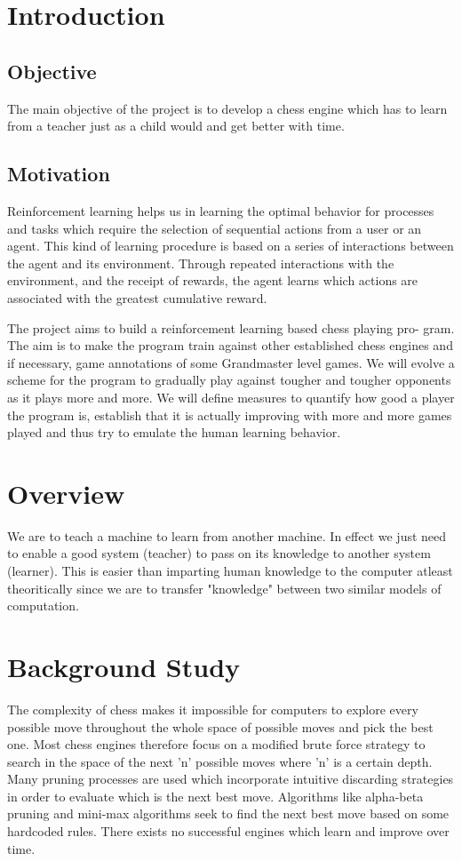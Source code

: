 \documentclass[a4paper,12pt,latin modern roman]{article}
\begin{document}
\section{Introduction}
\subsection*{Objective}
The main objective of the project is to develop a chess engine which has to learn from a teacher just as a child would and get better with time.
\subsection*{Motivation}
Reinforcement learning helps us in learning the optimal behavior for processes and tasks which require the selection of sequential actions from a user or an agent. This kind of learning procedure is based on a series of interactions between the agent and its environment. Through repeated interactions with the environment, and the receipt of rewards, the agent learns which actions are associated with the greatest cumulative reward.

The project aims to build a reinforcement learning based chess playing pro-
gram. The aim is to make the program train against other established chess
engines and if necessary, game annotations of some Grandmaster level games. We will
evolve a scheme for the program to gradually play against tougher and
tougher opponents as it plays more and more.
We will define measures to quantify how good a player the program is,
establish that it is actually improving with more and more games played and thus try to emulate the human learning behavior.

\section{Overview}
We are to teach a machine to learn from another machine. In effect we just need to enable a good system (teacher) to pass on its knowledge to another system (learner). This is easier than imparting human knowledge to the computer atleast theoritically since we are to transfer "knowledge" between two similar models of computation.  

\section{Background Study}
The complexity of chess makes it impossible for computers to explore every possible move throughout the whole space of possible moves and pick the best one. Most chess engines therefore focus on a modified brute force strategy to search in the space of the next 'n' possible moves where 'n' is a certain depth. Many pruning processes are used which incorporate intuitive discarding strategies in order to evaluate which is the next best move. Algorithms like alpha-beta pruning and mini-max algorithms seek to find the next best move based on some hardcoded rules. There exists no successful engines which learn and improve over time.
\end{document}
